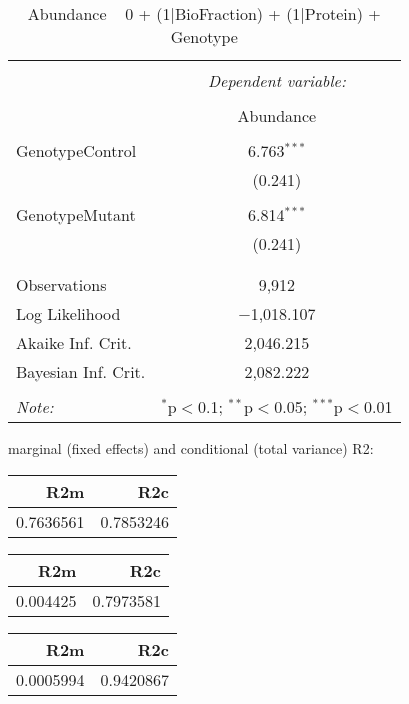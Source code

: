 \documentclass[11pt]{report}
\begin{document}
\begin{table}[!htbp] \centering 
  \caption{Abundance ~ 0 + (1|BioFraction) + (1|Protein) + Genotype} 
  \label{} 
\begin{tabular}{@{\extracolsep{5pt}}lc} 
\\[-1.8ex]\hline 
\hline \\[-1.8ex] 
 & \multicolumn{1}{c}{\textit{Dependent variable:}} \\ 
\cline{2-2} 
\\[-1.8ex] & Abundance \\ 
\hline \\[-1.8ex] 
 GenotypeControl & 6.763$^{***}$ \\ 
  & (0.241) \\ 
  & \\ 
 GenotypeMutant & 6.814$^{***}$ \\ 
  & (0.241) \\ 
  & \\ 
\hline \\[-1.8ex] 
Observations & 9,912 \\ 
Log Likelihood & $-$1,018.107 \\ 
Akaike Inf. Crit. & 2,046.215 \\ 
Bayesian Inf. Crit. & 2,082.222 \\ 
\hline 
\hline \\[-1.8ex] 
\textit{Note:}  & \multicolumn{1}{r}{$^{*}$p$<$0.1; $^{**}$p$<$0.05; $^{***}$p$<$0.01} \\ 
\end{tabular} 
\end{table} 
marginal (fixed effects) and conditional (total variance) R2:

\begin{tabular}{r|r}
\hline
R2m & R2c\\
\hline
0.7636561 & 0.7853246\\
\hline
\end{tabular}

\begin{tabular}{r|r}
\hline
R2m & R2c\\
\hline
0.004425 & 0.7973581\\
\hline
\end{tabular}

\begin{tabular}{r|r}
\hline
R2m & R2c\\
\hline
0.0005994 & 0.9420867\\
\hline
\end{tabular}
\end{document}

